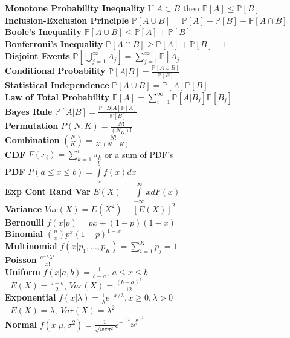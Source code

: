 \documentclass[3pt, a4paper]{article}
\newcommand{\PP}{\mathbb P}
\begin{document}
    \textbf{Monotone Probability Inequality} If $A\subset B$ then $\PP[A]\leq\PP[B]$\\
    \textbf{Inclusion-Exclusion Principle} $\PP[A\cup B]=\PP[A]+\PP[B]-\PP[A\cap B]$\\
    \textbf{Boole's Inequality} $\PP[A\cup B]\leq\PP[A]+\PP[B]$ \\
    \textbf{Bonferroni's Inequality} $\PP[A\cap B]\geq\PP[A]+\PP[B]-1$\\
    \textbf{Disjoint Events} $\PP[\bigcup\limits^{\infty}_{j=1}A_j] = \sum\limits^{\infty}_{j=1}\PP[A_j]$\\
    \textbf{Conditional Probability} $\PP[A|B]=\frac{\PP[A\cup B]}{\PP[B]}$\\
    \textbf{Statistical Independence} $\PP[A\cup B] = \PP[A]\PP[B]$ \\ 
    \textbf{Law of Total Probability} $\PP[A] = \sum\limits^{\infty}_{i=1}\PP[A|B_j]\PP[B_j]$ \\
    \textbf{Bayes Rule} $\PP[A|B] = \frac{\PP[B|A]\PP[A]}{\PP[B]}$ \\
    \textbf{Permutation} $P(N,K) = \frac{N!}{(N_K)!}$ \\
    \textbf{Combination} $\binom{N}{K} = \frac{N!}{K!(N-K)!}$ \\
    \textbf{CDF} $F(x_i) = \sum\limits_{k=1}^i \pi_k$ or a sum of PDF's \\ 
    \textbf{PDF} $P(a\leq x\leq b) = \int\limits_a^bf(x)dx$ \\
    \textbf{Exp Cont Rand Var} $E(X) = \int\limits_{-\infty}^{\infty}xdF(x)$ \\
    \textbf{Variance} $Var(X) = E(X^2)-[E(X)]^2$ \\
    \textbf{Bernoulli} $f(x|p) = px+(1-p)(1-x)$\\
    \textbf{Binomial} $\binom{n}{x}p^x(1-p)^{1-x}$ \\
    \textbf{Multinomial} $f(x|p_1,...,p_K) = \sum\limits_{i=1}^Kp_j=1$ \\
    \textbf{Poisson} $\frac{e^{-\lambda}\lambda^x}{x!}$\\
    \textbf{Uniform} $f(x|a,b)=\frac{1}{b-a},\ a\leq x\leq b$\\
      - $E(X) = \frac{a+b}{2}$, $Var(X) = \frac{(b-a)^2}{12}$ \\ 
    \textbf{Exponential} $f(x|\lambda)=\frac{1}{\lambda}e^{-x/\lambda}, x\geq0, \lambda>0$\\
      - $E(X) = \lambda,\ Var(X) = \lambda^2$ \\ 
    \textbf{Normal} $f(x|\mu,\sigma^2)=\frac{1}{\sqrt{w\pi\sigma^2}}e^{-\frac{(x-\mu)^2}{2\sigma^2}}$ \\
\end{document}
